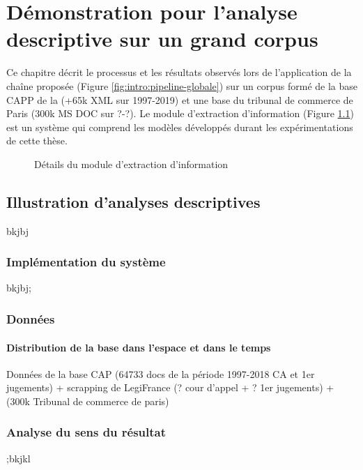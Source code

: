\chapter{Démonstration pour l'analyse descriptive sur un grand corpus}
\label{chap:demo}
Ce chapitre décrit le processus et les résultats observés lors de l'application de la chaîne proposée (Figure \ref{fig:intro:pipeline-globale}) sur un corpus formé de la base CAPP de la \citet{dila2019capp} (+65k XML sur 1997-2019) et une base du tribunal de commerce de Paris (300k MS DOC sur ?-?). Le module d'extraction d'information (Figure \ref{fig:demo:module-extraction}) est un système qui comprend les modèles développés durant les expérimentations de cette thèse. 


\begin{figure}[!htb]
	\centering 
	\caption{Détails du module d'extraction d'information}\label{fig:demo:module-extraction}
\end{figure}


\section{Illustration d'analyses descriptives}
\label{sec:demo:experimentations}

bkjbj


\subsection{Implémentation du système}

bkjbj;


\subsection{Données}
\subsubsection{Distribution de la base dans l'espace et dans le temps}

Données de la base CAP (64733 docs de la période 1997-2018 CA et 1er jugements) + scrapping de LegiFrance (? cour d'appel + ? 1er jugements) +  (300k Tribunal de commerce de paris)


\subsection{Analyse du sens du résultat}
;bkjkl
